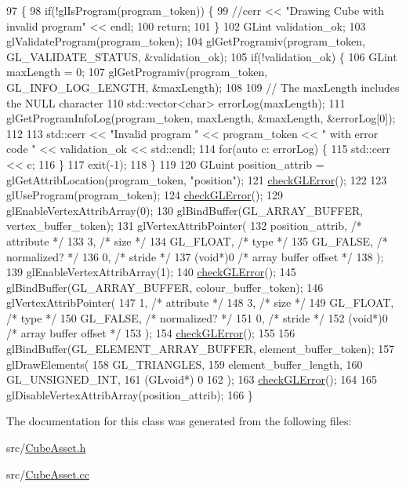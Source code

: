 \begin{DoxyCode}
97                                          \{
98   \textcolor{keywordflow}{if}(!glIsProgram(program\_token)) \{
99     \textcolor{comment}{//cerr << "Drawing Cube with invalid program" << endl;}
100     \textcolor{keywordflow}{return};
101   \}
102   GLint validation\_ok;
103   glValidateProgram(program\_token);
104   glGetProgramiv(program\_token, GL\_VALIDATE\_STATUS, &validation\_ok);
105   \textcolor{keywordflow}{if}(!validation\_ok) \{
106     GLint maxLength = 0;
107     glGetProgramiv(program\_token, GL\_INFO\_LOG\_LENGTH, &maxLength);
108 
109     \textcolor{comment}{// The maxLength includes the NULL character}
110     std::vector<char> errorLog(maxLength);
111     glGetProgramInfoLog(program\_token, maxLength, &maxLength, &errorLog[0]);
112 
113     std::cerr << \textcolor{stringliteral}{"Invalid program "} << program\_token << \textcolor{stringliteral}{" with error code "} << validation\_ok << std::endl;
114     \textcolor{keywordflow}{for}(\textcolor{keyword}{auto} c: errorLog) \{
115       std::cerr << c;
116     \}
117     exit(-1);
118   \}
119 
120   GLuint position\_attrib = glGetAttribLocation(program\_token, \textcolor{stringliteral}{"position"});
121   \hyperlink{_cube_asset_8cc_a75f201b0e53e68726854997957322b8d}{checkGLError}();
122 
123   glUseProgram(program\_token);
124   \hyperlink{_cube_asset_8cc_a75f201b0e53e68726854997957322b8d}{checkGLError}();
129   glEnableVertexAttribArray(0);
130   glBindBuffer(GL\_ARRAY\_BUFFER, vertex\_buffer\_token);
131   glVertexAttribPointer(
132     position\_attrib,        \textcolor{comment}{/* attribute */}
133     3,        \textcolor{comment}{/* size */}
134     GL\_FLOAT,   \textcolor{comment}{/* type */}
135     GL\_FALSE,   \textcolor{comment}{/* normalized? */}
136     0,        \textcolor{comment}{/* stride */}
137     (\textcolor{keywordtype}{void}*)0    \textcolor{comment}{/* array buffer offset */}
138   );
139   glEnableVertexAttribArray(1);
140   \hyperlink{_cube_asset_8cc_a75f201b0e53e68726854997957322b8d}{checkGLError}();
145   glBindBuffer(GL\_ARRAY\_BUFFER, colour\_buffer\_token);
146   glVertexAttribPointer(
147     1,        \textcolor{comment}{/* attribute */}
148     3,        \textcolor{comment}{/* size */}
149     GL\_FLOAT,   \textcolor{comment}{/* type */}
150     GL\_FALSE,   \textcolor{comment}{/* normalized? */}
151     0,        \textcolor{comment}{/* stride */}
152     (\textcolor{keywordtype}{void}*)0    \textcolor{comment}{/* array buffer offset */}
153   );
154   \hyperlink{_cube_asset_8cc_a75f201b0e53e68726854997957322b8d}{checkGLError}();
155 
156   glBindBuffer(GL\_ELEMENT\_ARRAY\_BUFFER, element\_buffer\_token);
157   glDrawElements(
158     GL\_TRIANGLES,
159     element\_buffer\_length,
160     GL\_UNSIGNED\_INT,
161     (GLvoid*) 0
162   );
163   \hyperlink{_cube_asset_8cc_a75f201b0e53e68726854997957322b8d}{checkGLError}();
164 
165   glDisableVertexAttribArray(position\_attrib);
166 \}
\end{DoxyCode}


The documentation for this class was generated from the following files\+:\begin{DoxyCompactItemize}
\item 
src/\hyperlink{_cube_asset_8h}{Cube\+Asset.\+h}\item 
src/\hyperlink{_cube_asset_8cc}{Cube\+Asset.\+cc}\end{DoxyCompactItemize}
